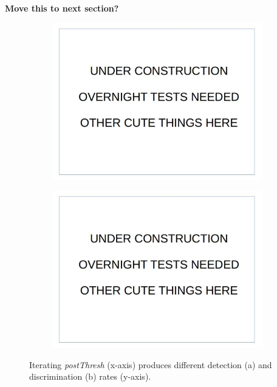 \documentclass[12pt]{report}
\begin{document}
\textbf{Move this to next section?}
\begin{figure}
  \begin{subfigure}{.49\linewidth}
  \includegraphics[width=1\linewidth]{figures/placeholder.jpg}
  \caption{}
\end{subfigure}
\hfill
\begin{subfigure}{.49\linewidth}
  \includegraphics[width=1\linewidth]{figures/placeholder.jpg}
  \caption{}
\end{subfigure}

\caption{Iterating \textit{postThresh} (x-axis) produces different detection (a) and discrimination (b) rates (y-axis).}
\label{fig:postthresh_iterate}
\end{figure}
\end{document}
